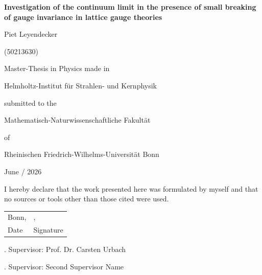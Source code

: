 \documentclass[12pt,a4paper,oneside,numbers=noenddot]{scrreprt}
\newcommand{\thesistitle}{Investigation of the continuum limit in the presence of small breaking of
gauge invariance in lattice gauge theories}
\newcommand{\thesisauthor}{Piet Leyendecker}
\newcommand{\matriculationnumber}{50213630}
\newcommand{\thesisfield}{Physics}
\newcommand{\thesisinstitute}{Helmholtz-Institut für Strahlen- und Kernphysik}
\newcommand{\thesismonthyear}{June / 2026}
\newcommand{\firstsupervisor}{Prof. Dr. Carsten Urbach}
\newcommand{\secondsupervisor}{Second Supervisor Name}
\begin{document}
\begin{titlepage}
\thispagestyle{empty}
\centering

\vspace*{2.4cm}

\vspace{0.35cm}
{\bfseries \thesistitle\par}

\vspace{1.25cm}

{\thesisauthor\par}
{(\matriculationnumber)\par}

\vspace{1.3cm}

Master-Thesis in \thesisfield{} made in

\vspace{0.55cm}

{\thesisinstitute\par}

\vspace{1.25cm}

submitted to the

\vspace{0.55cm}

Mathematisch-Naturwissenschaftliche Fakultät

\vspace{0.35cm}

of

\vspace{0.55cm}

Rheinischen Friedrich-Wilhelms-Universität Bonn

\vspace{1.25cm}

\thesismonthyear\par

\vfill

\end{titlepage}

\begin{titlepage}
\thispagestyle{empty}

\vspace*{11.5cm}

\noindent
I hereby declare that the work presented here was formulated by myself and that no sources or tools
other than those cited were used.

\vspace{1.2cm}

\noindent
\begin{tabular}{@{}p{5cm}p{6.5cm}@{}}
Bonn, \dotfill & \dotfill, \\
Date & Signature
\end{tabular}

\vspace{1.3cm}

. Supervisor: \firstsupervisor

\vspace{0.45cm}

. Supervisor: \secondsupervisor

\vfill

\end{titlepage}
\end{document}
